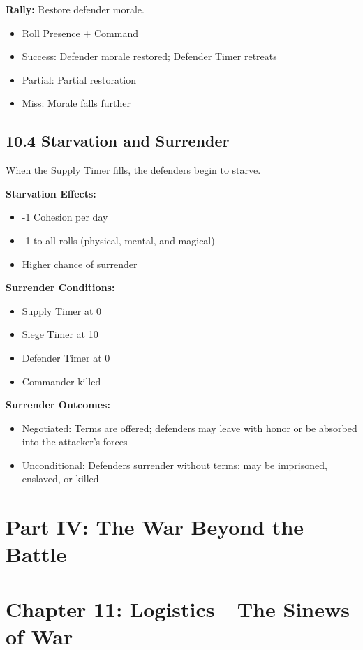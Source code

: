 \documentclass[11pt]{article}
\begin{document}
\textbf{Rally:} Restore defender morale.
\begin{itemize}
  \item Roll Presence + Command
  \item Success: Defender morale restored; Defender Timer retreats
  \item Partial: Partial restoration
  \item Miss: Morale falls further
\end{itemize}

\subsection{10.4 Starvation and Surrender}

When the Supply Timer fills, the defenders begin to starve.

\textbf{Starvation Effects:}
\begin{itemize}
  \item -1 Cohesion per day
  \item -1 to all rolls (physical, mental, and magical)
  \item Higher chance of surrender
\end{itemize}

\textbf{Surrender Conditions:}
\begin{itemize}
  \item Supply Timer at 0
  \item Siege Timer at 10
  \item Defender Timer at 0
  \item Commander killed
\end{itemize}

\textbf{Surrender Outcomes:}
\begin{itemize}
  \item Negotiated: Terms are offered; defenders may leave with honor or be absorbed into the attacker's forces
  \item Unconditional: Defenders surrender without terms; may be imprisoned, enslaved, or killed
\end{itemize}

\section{Part IV: The War Beyond the Battle}

\section{Chapter 11: Logistics—The Sinews of War}
\end{document}
